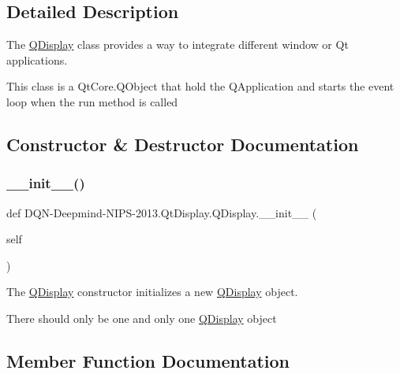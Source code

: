\subsection{Detailed Description}
The \hyperlink{classDQN-Deepmind-NIPS-2013_1_1QtDisplay_1_1QDisplay}{Q\+Display} class provides a way to integrate different window or Qt applications. 

This class is a Qt\+Core.\+Q\+Object that hold the Q\+Application and starts the event loop when the \textquotesingle{}run\textquotesingle{} method is called 

\subsection{Constructor \& Destructor Documentation}
\hypertarget{classDQN-Deepmind-NIPS-2013_1_1QtDisplay_1_1QDisplay_a4bf429fba1b45e555b41cac72f3d6f6a}{}\label{classDQN-Deepmind-NIPS-2013_1_1QtDisplay_1_1QDisplay_a4bf429fba1b45e555b41cac72f3d6f6a} 
\subsubsection{\texorpdfstring{\+\_\+\+\_\+init\+\_\+\+\_\+()}{\_\_init\_\_()}}
{\footnotesize\ttfamily def D\+QN-\/Deepmind-\/N\+I\+PS-\/2013.Qt\+Display.\+Q\+Display.\+\_\+\+\_\+init\+\_\+\+\_\+ (\begin{DoxyParamCaption}\item[{}]{self }\end{DoxyParamCaption})}



The \hyperlink{classDQN-Deepmind-NIPS-2013_1_1QtDisplay_1_1QDisplay}{Q\+Display} constructor initializes a new \hyperlink{classDQN-Deepmind-NIPS-2013_1_1QtDisplay_1_1QDisplay}{Q\+Display} object. 

There should only be one and only one \hyperlink{classDQN-Deepmind-NIPS-2013_1_1QtDisplay_1_1QDisplay}{Q\+Display} object 

\subsection{Member Function Documentation}
\hypertarget{classDQN-Deepmind-NIPS-2013_1_1QtDisplay_1_1QDisplay_ab3bca6243b3015a5bb26d0c00ba80d8f}{}\label{classDQN-Deepmind-NIPS-2013_1_1QtDisplay_1_1QDisplay_ab3bca6243b3015a5bb26d0c00ba80d8f} 

